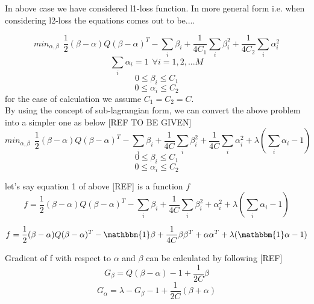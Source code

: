 In above case we have considered l1-loss function. In more general form i.e. when considering l2-loss the equations comes out to be....

\begin{equation}\label{mcmeq1}
min_{\alpha,\beta} \:\: \frac{1}{2}(\beta - \alpha)Q(\beta - \alpha)^T - \sum_i{\beta_i} + \frac{1}{4C_1}\sum_i{\beta_i^2} + \frac{1}{4C_2}\sum_i{\alpha_i^2}
\end{equation}
\begin{equation}\label{mcmeq4}
\sum_i{\alpha_i} = 1 \:\:\forall i={1, 2, ... M}
\end{equation}
\begin{equation}\label{mcmeq2}
0 \leq \beta_i \leq C_1
\end{equation}
\begin{equation}\label{mcmeq3}
0 \leq \alpha_i \leq C_2
\end{equation}
for the ease of calculation we assume $C_1 = C_2 = C$.\\
By using the concept of sub-lagrangian form, we can convert the above problem into a simpler one as below [REF TO BE GIVEN]
\begin{equation}\label{mcmeq1}
min_{\alpha,\beta} \:\: \frac{1}{2}(\beta - \alpha)Q(\beta - \alpha)^T - \sum_i{\beta_i} + \frac{1}{4C}\sum_i{\beta_i^2} + \frac{1}{4C}\sum_i{\alpha_i^2} + \lambda(\sum_i\alpha_i -1)
\end{equation}
\begin{equation}\label{mcmeq2}
0 \leq \beta_i \leq C_1
\end{equation}
\begin{equation}\label{mcmeq3}
0 \leq \alpha_i \leq C_2
\end{equation}

let's say equation 1 of above [REF] is a function $f$
\begin{equation}\label{mcmeq1}
f = \frac{1}{2}(\beta - \alpha)Q(\beta - \alpha)^T - \sum_i{\beta_i} + \frac{1}{4C}\sum_i{\beta_i^2 + \alpha_i^2} + \lambda(\sum_i\alpha_i -1)
\end{equation}

\begin{equation}\label{mcmeq1}
f = \frac{1}{2}(\beta - \alpha)Q(\beta - \alpha)^T - \mathbbm{1}\beta + \frac{1}{4C}{\beta\beta^T + \alpha\alpha^T}  + \lambda ( \mathbbm{1}\alpha - 1)
\end{equation}

Gradient of f with respect to $\alpha$ and $\beta$ can be calculated by following [REF]
\begin{equation}
G_\beta = Q(\beta - \alpha) -1 + \frac{1}{2C}\beta
\end{equation}
\begin{equation}
G_\alpha = \lambda - G_\beta -1 + \frac{1}{2C}(\beta + \alpha)
\end{equation}

